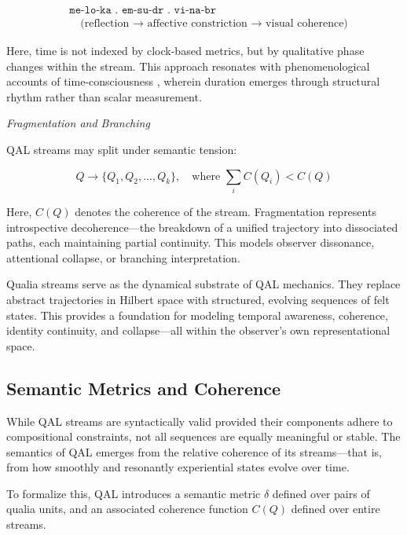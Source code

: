 \documentclass[11pt]{article}
\numberwithin{equation}{section} %
\begin{document}
\begin{align*}
& \texttt{me-lo-ka . em-su-dr . vi-na-br} \\
& \quad \text{(reflection → affective constriction → visual coherence)}
\end{align*}

Here, time is not indexed by clock-based metrics, but by qualitative phase changes within the stream. This approach resonates with phenomenological accounts of time-consciousness \cite{husserl1991, varela1999}, wherein duration emerges through structural rhythm rather than scalar measurement.

\bigskip

\noindent \textit{Fragmentation and Branching}

QAL streams may split under semantic tension:

\begin{equation}
Q \rightarrow \{ Q_1, Q_2, ..., Q_k \}, \quad \text{where } \sum_i C(Q_i) < C(Q)
\end{equation}

Here, \( C(Q) \) denotes the coherence of the stream. Fragmentation represents introspective decoherence—the breakdown of a unified trajectory into dissociated paths, each maintaining partial continuity. This models observer dissonance, attentional collapse, or branching interpretation.

Qualia streams serve as the dynamical substrate of QAL mechanics. They replace abstract trajectories in Hilbert space with structured, evolving sequences of felt states. This provides a foundation for modeling temporal awareness, coherence, identity continuity, and collapse—all within the observer’s own representational space.

\subsection{Semantic Metrics and Coherence}

While QAL streams are syntactically valid provided their components adhere to compositional constraints, not all sequences are equally meaningful or stable. The semantics of QAL emerges from the relative coherence of its streams—that is, from how smoothly and resonantly experiential states evolve over time.

To formalize this, QAL introduces a semantic metric \( \delta \) defined over pairs of qualia units, and an associated coherence function \( C(Q) \) defined over entire streams.
\end{document}

